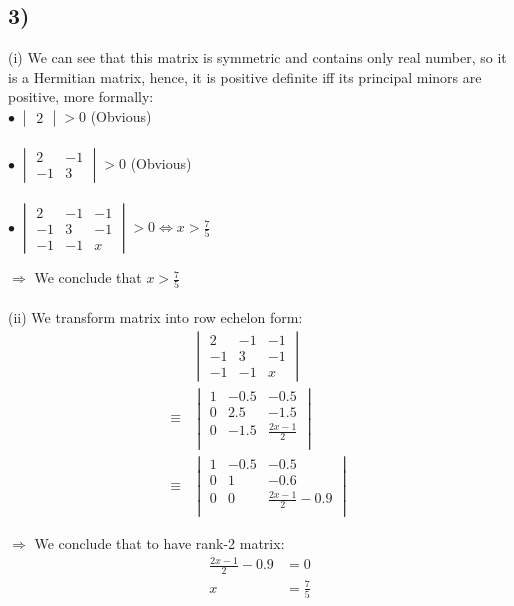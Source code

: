 \documentclass{article}
\begin{document}
\subsection*{3)}
(i) We can see that this matrix is symmetric and contains only real number, so it is a Hermitian matrix, hence, it is positive definite iff its principal minors are positive, more formally:\\
$\bullet\;
\begin{vmatrix}
2
\end{vmatrix}
 > 0$ (Obvious)\\\\$
\bullet\;{
\begin{vmatrix}
2 & -1\\
-1 & 3
\end{vmatrix}
} > 0$ (Obvious)\\\\$
\bullet\;{
\begin{vmatrix}
2 & -1 & -1\\
-1 & 3 & -1\\
-1 & -1 & x
\end{vmatrix}
} > 0 \iff x > \frac{7}{5}
$

$\Rightarrow$ We conclude that $x > \frac{7}{5}$\\\\
(ii) We transform matrix into row echelon form:
\begin{align*}
& \begin{vmatrix}
2 & -1 & -1\\
-1 & 3 & -1\\
-1 & -1 & x
\end{vmatrix}\\
\equiv & \begin{vmatrix}
1 & -0.5 & -0.5\\
0 & 2.5 & -1.5\\
0 & -1.5 & \frac{2x - 1}{2}\\
\end{vmatrix}\\
\equiv & \begin{vmatrix}
1 & -0.5 & -0.5\\
0 & 1 & -0.6\\
0 & 0 & \frac{2x - 1}{2} - 0.9\\
\end{vmatrix}
\end{align*}

$\Rightarrow$ We conclude that to have rank-2 matrix:
\begin{align*}
\frac{2x - 1}{2} - 0.9 &= 0\\
x &= \frac{7}{5}
\end{align*}
\end{document}
